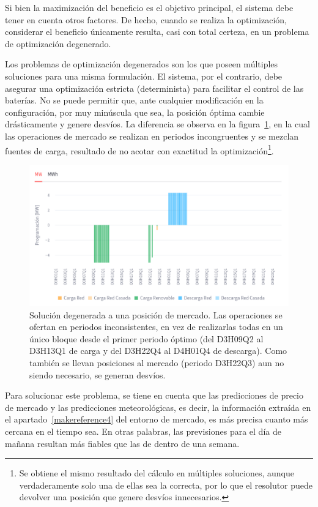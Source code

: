 Si bien la maximización del beneficio es el objetivo principal, el sistema debe tener en cuenta otros factores. De hecho, cuando se realiza la optimización, considerar el beneficio únicamente resulta, casi con total certeza, en un problema de optimización degenerado.

Los problemas de optimización degenerados son los que poseen múltiples soluciones para una misma formulación. El sistema, por el contrario, debe asegurar una optimización estricta (determinista) para facilitar el control de las baterías. No se puede permitir que, ante cualquier modificación en la configuración, por muy minúscula que sea, la posición óptima cambie drásticamente y genere desvíos. La diferencia se observa en la figura~\ref{fig:solucion-degenerada}, en la cual las operaciones de mercado se realizan en periodos incongruentes y se mezclan fuentes de carga, resultado de no acotar con exactitud la optimización\footnote{Se obtiene el mismo resultado del cálculo en múltiples soluciones, aunque verdaderamente solo una de ellas sea la correcta, por lo que el resolutor puede devolver una posición que genere desvíos innecesarios.}.

\begin{figure}
  \centering
  \includegraphics[width=0.75\linewidth]{figures/solucion-degenerada.png}
  \caption[Solución degenerada.]{Solución degenerada a una posición de mercado. Las operaciones se ofertan en periodos inconsistentes, en vez de realizarlas todas en un único bloque desde el primer periodo óptimo (del D3H09Q2 al D3H13Q1 de carga y del D3H22Q4 al D4H01Q4 de descarga). Como también se llevan posiciones al mercado (periodo D3H22Q3) aun no siendo necesario, se generan desvíos.}%
  \label{fig:solucion-degenerada}
\end{figure}

Para solucionar este problema, se tiene en cuenta que las predicciones de precio de mercado y las predicciones meteorológicas, es decir, la información extraída en el apartado~\ref{makereference4} del entorno de mercado, es más precisa cuanto más cercana en el tiempo sea. En otras palabras, las previsiones para el día de mañana resultan más fiables que las de dentro de una semana.

